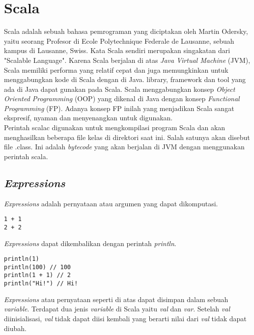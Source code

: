 \section{Scala}


Scala adalah sebuah bahasa pemrograman yang diciptakan oleh Martin Odersky, yaitu seorang Profesor di Ecole Polytechnique Federale de Lausanne, sebuah kampus di Lausanne, Swiss. Kata Scala sendiri merupakan singakatan dari "Scalable Language". Karena Scala berjalan di atas \textit{Java Virtual Machine} (JVM), Scala memiliki performa yang relatif cepat dan juga memungkinkan untuk menggabungkan kode di Scala dengan di Java. library, framework dan tool yang ada di Java dapat gunakan pada Scala. Scala menggabungkan konsep \textit{Object Oriented Programming} (OOP) yang dikenal di Java dengan konsep \textit{Functional Programming} (FP). Adanya konsep FP inilah yang menjadikan Scala sangat ekspresif, nyaman dan menyenangkan untuk digunakan. \\

Perintah scalac digunakan untuk mengkompilasi program Scala dan akan menghasilkan beberapa file kelas di direktori saat ini. Salah satunya akan disebut file .class. Ini adalah \textit{bytecode} yang akan berjalan di JVM dengan menggunakan perintah scala. \\

\subsection{\textit{Expressions}}

\textit{Expressions} adalah pernyataan atau argumen yang dapat dikomputasi.

\begin{verbatim}
1 + 1
2 + 2 
\end{verbatim}

\textit{Expressions} dapat dikembalikan dengan perintah \textit{println}.

\begin{verbatim}
println(1)
println(100) // 100
println(1 + 1) // 2
println("Hi!") // Hi!
\end{verbatim}


\textit{Expressions} atau pernyataan seperti di atas dapat disimpan dalam sebuah \textit{variable}. Terdapat dua jenis \textit{variable} di Scala yaitu \textit{val} dan \textit{var}. Setelah \textit{val} diinisialisasi, \textit{val} tidak dapat diisi kembali yang berarti nilai dari \textit{val} tidak dapat diubah.

